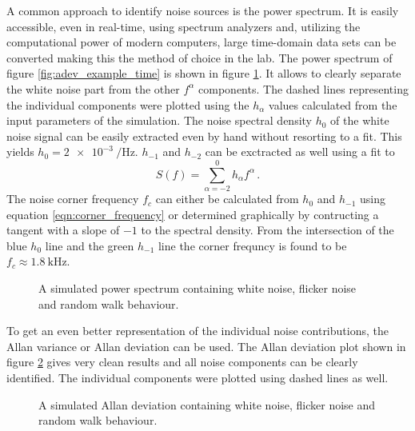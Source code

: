 A common approach to identify noise sources is the power spectrum. It is easily accessible, even in real-time, using spectrum analyzers and, utilizing the computational power of modern computers, large time-domain data sets can be converted making this the method of choice in the lab. The power spectrum of figure \ref{fig:adev_example_time} is shown in figure \ref{fig:adev_example_psd}. It allows to clearly separate the white noise part from the other $f^{\alpha}$ components. The dashed lines representing the individual components were plotted using the $h_\alpha$ values calculated from the input parameters of the simulation. The noise spectral density $h_0$ of the white noise signal can be easily extracted even by hand without resorting to a fit. This yields $h_{0} = \qty{2e-3}{\per \Hz} $. $h_{-1}$ and $h_{-2}$ can be exctracted as well using a fit to
\begin{equation}
    S(f) = \sum_{\alpha = -2}^0 h_\alpha f^\alpha \, .
\end{equation}
The noise corner frequency $f_c$ can either be calculated from $h_0$ and $h_{-1}$ using equation \ref{eqn:corner_frequency} or determined graphically by contructing a tangent with a slope of $-1$ to the spectral density. From the intersection of the blue $h_0$ line and the green $h_{-1}$ line the corner frequncy is found to be $f_c \approx \qty{1.8}{\kHz}$.

\begin{figure}[hb]
    \centering
    
    \caption{A simulated power spectrum containing white noise, flicker noise and random walk behaviour.}
    \label{fig:adev_example_psd}
\end{figure}

To get an even better representation of the individual noise contributions, the Allan variance or Allan deviation can be used. The Allan deviation plot shown in figure \ref{fig:adev_example_adev} gives very clean results and all noise components can be clearly identified. The individual components were plotted using dashed lines as well.

\begin{figure}[hb]
    \centering
    
    \caption{A simulated Allan deviation containing white noise, flicker noise and random walk behaviour.}
    \label{fig:adev_example_adev}
\end{figure}


